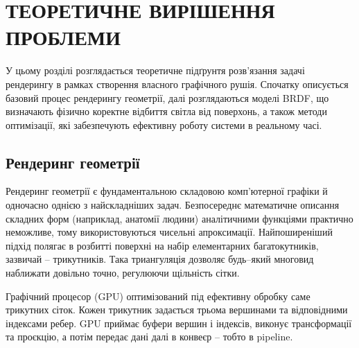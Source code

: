 

 \chapter{ТЕОРЕТИЧНЕ ВИРІШЕННЯ ПРОБЛЕМИ}

 
 У цьому розділі розглядається теоретичне підґрунтя розв'язання задачі рендерингу в рамках створення власного графічного рушія. Спочатку описується 
 базовий процес рендерингу геометрії, далі розглядаються моделі BRDF, що визначають фізично коректне відбиття світла від поверхонь, а також методи оптимізації, 
 які забезпечують ефективну роботу системи в реальному часі.

\section{Рендеринг геометрії}
  \setcounter{equation}{0}
 \setcounter{theorem}{0}
 Рендеринг геометрії є фундаментальною складовою комп’ютерної графіки й одночасно однією з найскладніших задач. Безпосереднє математичне описання складних форм (наприклад, анатомії людини) аналітичними функціями практично неможливе, тому використовуються чисельні апроксимації. Найпоширеніший підхід полягає в розбитті поверхні на набір елементарних багатокутників, зазвичай -- трикутників. Така триангуляція дозволяє будь–який многовид наближати довільно точно, регулюючи щільність сітки.

Графічний процесор (GPU) оптимізований під ефективну обробку саме трикутних сіток. Кожен трикутник задається трьома вершинами та відповідними індексами ребер. GPU приймає буфери вершин і індексів, виконує трансформації та проєкцію, а потім передає дані далі в конвеєр -- тобто в pipeline.

